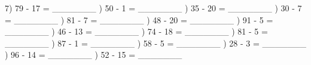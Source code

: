 \documentclass{article}%
\begin{document}
7) 79 {-} 17 = \_\_\_\_\_\_\_%
\newline%
\newline%
) 50 {-} 1 = \_\_\_\_\_\_\_%
\newline%
\newline%
) 35 {-} 20 = \_\_\_\_\_\_\_%
\newline%
\newline%
) 30 {-} 7 = \_\_\_\_\_\_\_%
\newline%
\newline%
) 81 {-} 7 = \_\_\_\_\_\_\_%
\newline%
\newline%
) 48 {-} 20 = \_\_\_\_\_\_\_%
\newline%
\newline%
) 91 {-} 5 = \_\_\_\_\_\_\_%
\newline%
\newline%
) 46 {-} 13 = \_\_\_\_\_\_\_%
\newline%
\newline%
) 74 {-} 18 = \_\_\_\_\_\_\_%
\newline%
\newline%
) 81 {-} 5 = \_\_\_\_\_\_\_%
\newline%
\newline%
) 87 {-} 1 = \_\_\_\_\_\_\_%
\newline%
\newline%
) 58 {-} 5 = \_\_\_\_\_\_\_%
\newline%
\newline%
) 28 {-} 3 = \_\_\_\_\_\_\_%
\newline%
\newline%
) 96 {-} 14 = \_\_\_\_\_\_\_%
\newline%
\newline%
) 52 {-} 15 = \_\_\_\_\_\_\_%
\newline%
\end{document}
